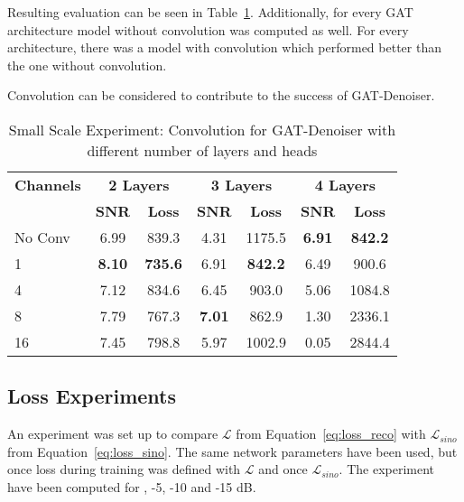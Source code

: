 Resulting evaluation can be seen in Table~\ref{tab:small_convolution_2}.
Additionally, for every GAT architecture model without convolution was computed as well.
For every architecture, there was a model with convolution which performed better than the one without convolution.


\begin{tcolorbox}[colback=red!5!white,colframe=red!75!black]
  Convolution can be considered to contribute to the success of GAT-Denoiser.
\end{tcolorbox}



\begin{table}[H]
  \centering
  \begin{tabular}{l|cc|cc|cc}
    \toprule
    \textbf{Channels } & \multicolumn{2}{c|}{\textbf{2 Layers}} & \multicolumn{2}{c|}{\textbf{3 Layers}} & \multicolumn{2}{c}{\textbf{4 Layers}}  \\
                       & \small \small \textbf{SNR} & \small \textbf{Loss} & \small \small \textbf{SNR} & \small \textbf{Loss} & \small \small \textbf{SNR} & \small \textbf{Loss} \\ 
    \midrule
		No Conv & 6.99  & 839.3 & 4.31   & 1175.5 & \textbf{6.91} & \textbf{842.2}     \\ \hline
		1       & \textbf{8.10}  & \textbf{735.6} & 6.91   & \textbf{842.2} & 6.49 & 900.6     \\ \hline
		4       & 7.12  & 834.6 & 6.45   & 903.0 & 5.06 & 1084.8   \\ \hline
		8       & 7.79  & 767.3 & \textbf{7.01}   & 862.9 & 1.30 & 2336.1    \\ \hline
		16      & 7.45  & 798.8 & 5.97   & 1002.9 & 0.05  & 2844.4   \\
    \midrule
  \end{tabular}

  \caption{Small Scale Experiment: Convolution for GAT-Denoiser with different number of layers and heads}
  \label{tab:small_convolution_2}
\end{table}


\subsection{Loss Experiments}
An experiment was set up to compare $\mathcal{L}$ from Equation~\ref{eq:loss_reco} 
with $\mathcal{L}_{sino}$ from Equation~\ref{eq:loss_sino}.
The same network parameters have been used, but once loss during training was defined 
with $\mathcal{L}$ and once $\mathcal{L}_{sino}$. The experiment
have been computed for , -5, -10 and -15 dB.

